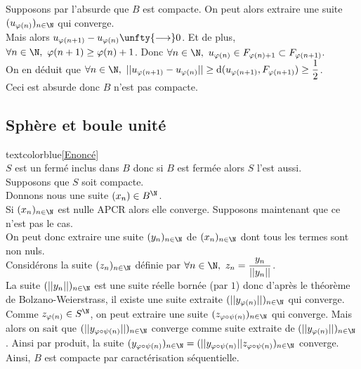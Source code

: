 \documentclass{book}
\begin{document}
\begin{enumerate}[leftmargin=*]
		Supposons par l'absurde que $B$ est compacte. On peut alors extraire une suite $(u_{\varphi(n)})_{n\in \N}$ qui converge.\\
		Mais alors $u_{\varphi(n+1)}-u_{\varphi(n)}\unfty{\longrightarrow}0$. Et de plus, $\forall n\in \N,\ \varphi(n+1)\geq \varphi(n)+1$. Donc $\forall n\in \N,\ u_{\varphi(n)}\in F_{\varphi(n)+1}\subset F_{\varphi(n+1)}$.\\
		On en déduit que $\forall n\in \N,\ ||u_{\varphi(n+1)}-u_{\varphi(n)}||\geq \text{d}(u_{\varphi(n+1)},F_{\varphi(n+1)})\geq \displaystyle\frac{1}{2}$.\\
		Ceci est absurde donc $B$ n'est pas compacte.
	\end{enumerate}
	
	\subsection{Sphère et boule unité }
	\label{sec:sphere-et-boule-unite-etoile3}
	textcolor{blue}{\hyperref[Sphère et boule unité]{[Enoncé]}}\\
	$S$ est un fermé inclus dans $B$ donc si $B$ est fermée alors $S$ l'est aussi.\\
	Supposons que $S$ soit compacte.\\
	Donnons nous une suite $(x_n)\in B^\N$.\\
	Si $(x_n)_{n\in \N}$ est nulle APCR alors elle converge. Supposons maintenant que ce n'est pas le cas.\\
	On peut donc extraire une suite $(y_n)_{n\in \N}$ de $(x_n)_{n\in \N}$ dont tous les termes sont non nuls.\\
	Considérons la suite $(z_n)_{n\in \N}$ définie par $\forall n\in \N,\ z_n=\displaystyle\frac{y_n}{||y_n||}$.\\
	La suite $(||y_n||)_{n\in \N}$ est une suite réelle bornée (par $1$) donc d'après le théorème de Bolzano-Weierstrass, il existe une suite extraite $(||y_{\varphi(n)}||)_{n\in \N}$ qui converge.\\
	Comme $z_{\varphi(n)}\in S^\N$, on peut extraire une suite $(z_{\varphi\circ\psi(n)})_{n\in \N}$ qui converge. Mais alors on sait que $(||y_{\varphi\circ\psi(n)}||)_{n\in \N}$ converge comme suite extraite de $(||y_{\varphi(n)}||)_{n\in \N}$. Ainsi par produit, la suite $(y_{\varphi\circ\psi(n)})_{n\in \N}=(||y_{\varphi\circ\psi(n)}||z_{\varphi\circ\psi(n)})_{n\in \N}$ converge.\\
	Ainsi, $B$ est compacte par caractérisation séquentielle.
	
\end{document}
